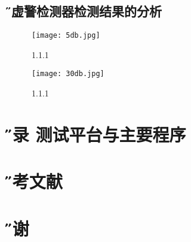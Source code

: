 \documentclass[12pt]{article} %
\newcommand{\xiaosanhao}{\fontsize{15pt}{\baselineskip}\selectfont}    %
\begin{document}
  	
  	\subsection{\H 恒虚警检测器检测结果的分析 } 
  	
  	 \begin{figure}[htbp] %
 		  \centering
 		  \texttt{[image: 5db.jpg]} 
  		  \caption{1.1.1 }
  		 \label{fig:1.1.1}
		\end{figure}
		
		 \begin{figure}[htbp] %
 		  \centering
 		  \texttt{[image: 30db.jpg]} 
  		  \caption{1.1.1 }
  		 \label{fig:1.1.1}
		\end{figure}
 
  \section{\xiaosanhao \H 附录 \quad 测试平台与主要程序}
  
    \section{\xiaosanhao \H 参考文献}
    
      \section{\xiaosanhao \H 致谢}
      
      
 
\end{document}
